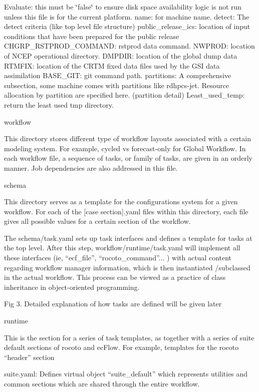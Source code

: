 Evaluate\-: this must be \char`\"{}false\char`\"{} to ensure disk space availability logic is not run unless this file is for the current platform. name\-: for machine name. detect\-: The detect criteria (like top level file structure) public\-\_\-release\-\_\-ics\-: location of input conditions that have been prepared for the public release C\-H\-G\-R\-P\-\_\-\-R\-S\-T\-P\-R\-O\-D\-\_\-\-C\-O\-M\-M\-A\-N\-D\-: rstprod data command. N\-W\-P\-R\-O\-D\-: location of N\-C\-E\-P operational directory. D\-M\-P\-D\-I\-R\-: location of the global dump data R\-T\-M\-F\-I\-X\-: location of the C\-R\-T\-M fixed data files used by the G\-S\-I data assimilation B\-A\-S\-E\-\_\-\-G\-I\-T\-: git command path. partitions\-: A comprehensive subsection, some machine comes with partitions like rdhpcs-\/jet. Resource allocation by partition are specified here. (partition detail) Least\-\_\-used\-\_\-temp\-: return the least used tmp directory.

workflow

This directory stores different type of workflow layouts associated with a certain modeling system. For example, cycled vs forecast-\/only for Global Workflow. In each workflow file, a sequence of tasks, or family of tasks, are given in an orderly manner. Job dependencies are also addressed in this file.

schema

This directory serves as a template for the configurations system for a given workflow. For each of the \mbox{[}case section\mbox{]}.yaml files within this directory, each file gives all possible values for a certain section of the workflow.

The schema/task.\-yaml sets up task interfaces and defines a template for tasks at the top level. After this step, workflow/runtime/task.\-yaml will implement all these interfaces (ie, “ecf\-\_\-file”, “rocoto\-\_\-command”... ) with actual content regarding workflow manager information, which is then instantiated /subclassed in the actual workflow. This process can be viewed as a practice of class inheritance in object-\/oriented programming.

Fig 3. Detailed explanation of how tasks are defined will be given later

runtime

This is the section for a series of task templates, as together with a series of suite default sections of rocoto and ec\-Flow. For example, templates for the rocoto “header” section

suite.\-yaml\-: Defines virtual object “suite\-\_\-default” which represents utilities and common sections which are shared through the entire workflow.

